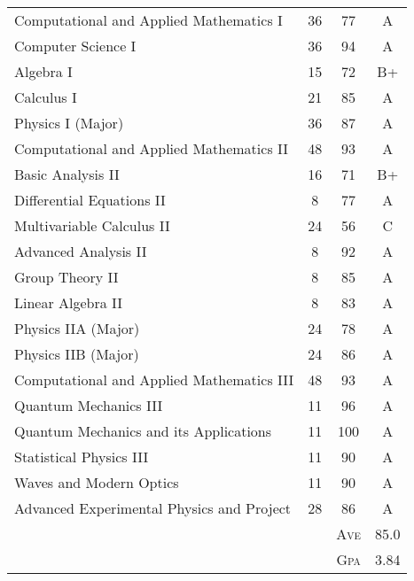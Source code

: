 \begin{center}

	\tabletail{%
	}
	\tablelasttail{}	
	
	 \begin{supertabular}{lccc}
	 Computational and Applied Mathematics I & 36 & 77 & A \\
	 Computer Science I & 36 & 94 & A \\
	 Algebra I & 15 & 72 & B+ \\
	 Calculus I & 21 & 85 & A \\
	 Physics I (Major) & 36 & 87 & A \\
	 Computational and Applied Mathematics II & 48 & 93 & A \\
	 Basic Analysis II & 16 & 71 & B+ \\
	 Differential Equations II & 8 & 77 & A \\
	 Multivariable Calculus II & 24 & 56 & C \\
	 Advanced Analysis II & 8 & 92 & A \\
	 Group Theory II & 8 & 85 & A \\
	 Linear Algebra II & 8 & 83 & A \\
	 Physics IIA (Major) & 24 & 78 & A \\
	 Physics IIB (Major) & 24 & 86 & A \\
	 Computational and Applied Mathematics III & 48 & 93 & A \\
	 Quantum Mechanics III & 11 & 96 & A \\
	 Quantum Mechanics and its Applications & 11 & 100 & A \\
	 Statistical Physics III & 11 & 90 & A \\
	 Waves and Modern Optics & 11 & 90 & A \\
	 Advanced Experimental Physics and Project & 28 & 86 & A \\
	 & & \textsc{Ave} & 85.0  \\
	 & & \textsc{Gpa} & 3.84
	 \end{supertabular}
\end{center}

